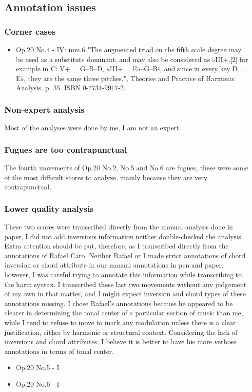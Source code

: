 	\subsection{Annotation issues}
    \subsubsection{Corner cases}
      \begin{itemize}
        \item Op.20 No.4 - IV: mm.6
		"The augmented triad on the fifth scale degree may be used as a substitute dominant, and may also be considered as ♭III+,[2] for example in C: V+ = G–B–D\♯, ♭III+ = E♭–G–B♮, and since in every key D\♯ = E♭, they are the same three pitches.", Theories and Practice of Harmonic Analysis. p. 35. ISBN 0-7734-9917-2.
      \end{itemize}
		\subsubsection{Non-expert analysis}
    Most of the analyses were done by me, I am not an expert.
		\subsubsection{Fugues are too contrapunctual}
    The fourth movements of Op.20 No.2, No.5 and No.6 are fugues, these were some of the most difficult scores to analyze, mainly because they are very contrapunctual.
		\subsubsection{Lower quality analysis}
    These two scores were transcribed directly from the manual analysis done in paper, I did not add inversions information neither double-checked the analysis. Extra attention should be put, therefore, as I transcribed directly from the annotations of Rafael Caro. Neither Rafael or I made strict annotations of chord inversion or chord attribute in our manual annotations in pen and paper, however, I was careful trying to annotate this information while transcribing to the harm syntax. I transcribed these last two movements without any judgement of my own in that matter, and I might expect inversion and chord types of these annotations missing. I chose Rafael's annotations because he appeared to be clearer in determining the tonal center of a particular section of music than me, while I tend to refuse to move to mark any modulation unless there is a clear justification, either by harmonic or structural context. Considering the lack of inversions and chord attributes, I believe it is better to have his more verbose annotations in terms of tonal center.
    \begin{itemize}
    \item Op.20 No.5 - I
		\item Op.20 No.6 - I
    \end{itemize}
